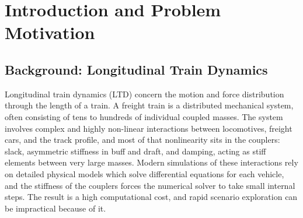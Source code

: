 \chapter{Introduction and Problem Motivation}
\label{ch:intro}

\section{Background: Longitudinal Train Dynamics}

Longitudinal train dynamics (LTD) concern the motion and force distribution through the length of a train. A freight train is a distributed mechanical system, often consisting of tens to hundreds of individual coupled masses. The system involves complex and highly non-linear interactions between locomotives, freight cars, and the track profile, and most of that nonlinearity sits in the couplers: slack, asymmetric stiffness in buff and draft, and damping, acting as stiff elements between very large masses. Modern simulations of these interactions rely on detailed physical models which solve differential equations for each vehicle, and the stiffness of the couplers forces the numerical solver to take small internal steps. The result is a high computational cost, and rapid scenario exploration can be impractical because of it.

